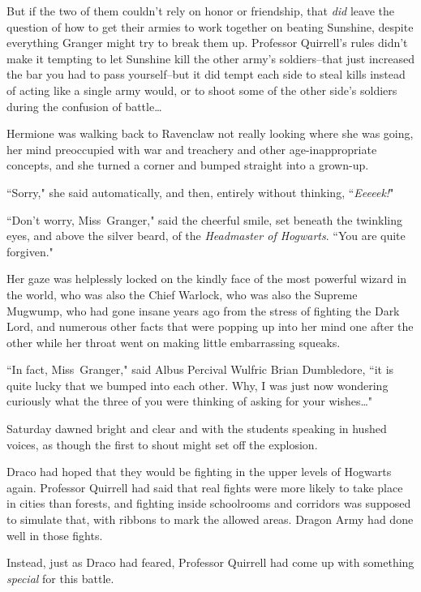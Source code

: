 But if the two of them couldn't rely on honor or friendship, that \emph{did} leave the question of how to get their armies to work together on beating Sunshine, despite everything Granger might try to break them up. Professor Quirrell's rules didn't make it tempting to let Sunshine kill the other army's soldiers\---that just increased the bar you had to pass yourself\---but it did tempt each side to steal kills instead of acting like a single army would, or to shoot some of the other side's soldiers during the confusion of battle{\ldots}

\later

Hermione was walking back to Ravenclaw not really looking where she was going, her mind preoccupied with war and treachery and other age-inappropriate concepts, and she turned a corner and bumped straight into a grown-up.

``Sorry," she said automatically, and then, entirely without thinking, ``\emph{Eeeeek!}"

``Don't worry, Miss~Granger," said the cheerful smile, set beneath the twinkling eyes, and above the silver beard, of the \emph{Headmaster of Hogwarts}. ``You are quite forgiven."

Her gaze was helplessly locked on the kindly face of the most powerful wizard in the world, who was also the Chief Warlock, who was also the Supreme Mugwump, who had gone insane years ago from the stress of fighting the Dark Lord, and numerous other facts that were popping up into her mind one after the other while her throat went on making little embarrassing squeaks.

``In fact, Miss~Granger," said Albus Percival Wulfric Brian Dumbledore, ``it is quite lucky that we bumped into each other. Why, I was just now wondering curiously what the three of you were thinking of asking for your wishes{\ldots}"

\later

Saturday dawned bright and clear and with the students speaking in hushed voices, as though the first to shout might set off the explosion.

\later

Draco had hoped that they would be fighting in the upper levels of Hogwarts again. Professor Quirrell had said that real fights were more likely to take place in cities than forests, and fighting inside schoolrooms and corridors was supposed to simulate that, with ribbons to mark the allowed areas. Dragon Army had done well in those fights.

Instead, just as Draco had feared, Professor Quirrell had come up with something \emph{special} for this battle.

